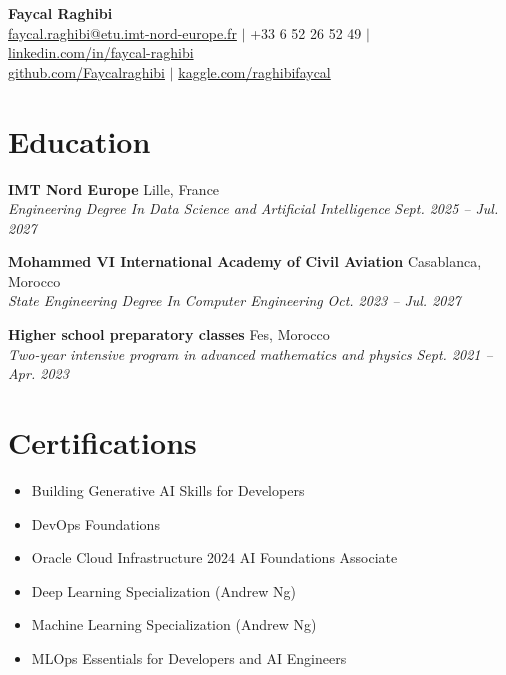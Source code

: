 \documentclass[11pt,a4paper]{article}
\newcommand{\resumeItem}[1]{\item\small{#1}}
\newcommand{\resumeSubheading}[4]{
  \vspace{1pt}
  \noindent\textbf{#1} \hfill #2 \\
  \textit{#3} \hfill \textit{#4}
  \vspace{0pt}
}
\begin{document}
\vspace*{-15mm}
\begin{center}
    {\LARGE \textbf{Faycal Raghibi}} \\

    \href{mailto:faycal.raghibi@etu.imt-nord-europe.fr}{faycal.raghibi@etu.imt-nord-europe.fr} $|$ 
    +33 6 52 26 52 49 $|$ 
    \href{https://linkedin.com/in/faycal-raghibi}{linkedin.com/in/faycal-raghibi} \\
    \href{https://github.com/Faycalraghibi}{github.com/Faycalraghibi} $|$ 
    \href{https://kaggle.com/raghibifaycal}{kaggle.com/raghibifaycal}
\end{center}

\vspace{-10pt}

\section{Education}

\resumeSubheading
{IMT Nord Europe}{Lille, France}
{Engineering Degree In Data Science and Artificial Intelligence}{Sept. 2025 -- Jul. 2027}

\resumeSubheading
{Mohammed VI International Academy of Civil Aviation}{Casablanca, Morocco}
{State Engineering Degree In Computer Engineering}{Oct. 2023 -- Jul. 2027}

\resumeSubheading
{Higher school preparatory classes}{Fes, Morocco}
{Two-year intensive program in advanced mathematics and physics}{Sept. 2021 -- Apr. 2023}

\section{Certifications}

\vspace{-2pt}
\begin{minipage}[t]{0.48\textwidth}
\begin{itemize}
    \resumeItem{Building Generative AI Skills for Developers}
    \resumeItem{DevOps Foundations}
    \resumeItem{Oracle Cloud Infrastructure 2024 AI Foundations Associate}
\end{itemize}
\end{minipage}
\hfill
\begin{minipage}[t]{0.48\textwidth}
\begin{itemize}
    \resumeItem{Deep Learning Specialization (Andrew Ng)}
    \resumeItem{Machine Learning Specialization (Andrew Ng)}
    \resumeItem{MLOps Essentials for Developers and AI Engineers}
\end{itemize}
\end{minipage}
\end{document}
